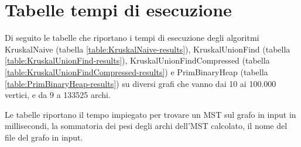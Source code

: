 \appendix
\section{Tabelle tempi di esecuzione}
\label{cap:runtime-tables}

Di seguito le tabelle che riportano i tempi di esecuzione degli algoritmi KruskalNaive (tabella \ref{table:KruskalNaive-results}), KruskalUnionFind (tabella \ref{table:KruskalUnionFind-results}), KruskalUnionFindCompressed  (tabella \ref{table:KruskalUnionFindCompressed-results}) e PrimBinaryHeap (tabella \ref{table:PrimBinaryHeap-results}) su diversi grafi che vanno dai 10 ai 100.000 vertici, e da 9 a 133525 archi.

Le tabelle riportano il tempo impiegato per trovare un MST sul grafo in input in millisecondi, la sommatoria dei pesi degli archi dell'MST calcolato, il nome del file del grafo in input.

